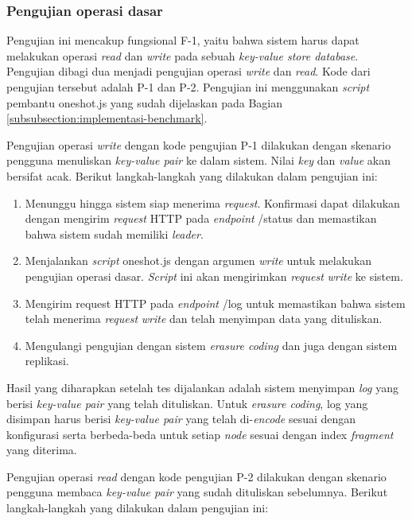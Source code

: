 \subsubsection{Pengujian operasi dasar}
\label{subsubsection:pengujian-operasi-dasar}

Pengujian ini mencakup fungsional F-1, yaitu bahwa sistem harus dapat melakukan operasi \textit{read} dan \textit{write} pada sebuah \textit{key-value store database}. Pengujian dibagi dua menjadi pengujian operasi \textit{write} dan \textit{read}. Kode dari pengujian tersebut adalah P-1 dan P-2. Pengujian ini menggunakan \textit{script} pembantu oneshot.js yang sudah dijelaskan pada Bagian \ref{subsubsection:implementasi-benchmark}.

Pengujian operasi \textit{write} dengan kode pengujian P-1 dilakukan dengan skenario pengguna menuliskan \textit{key-value pair} ke dalam sistem. Nilai \textit{key} dan \textit{value} akan bersifat acak. Berikut langkah-langkah yang dilakukan dalam pengujian ini:

\begin{enumerate}
  \item Menunggu hingga sistem siap menerima \textit{request}. Konfirmasi dapat dilakukan dengan mengirim \textit{request} HTTP pada \textit{endpoint} /status dan memastikan bahwa sistem sudah memiliki \textit{leader}.
  \item Menjalankan \textit{script} oneshot.js dengan argumen \textit{write} untuk melakukan pengujian operasi dasar. \textit{Script} ini akan mengirimkan \textit{request} \textit{write} ke sistem.
  \item Mengirim request HTTP pada \textit{endpoint} /log untuk memastikan bahwa sistem telah menerima \textit{request} \textit{write} dan telah menyimpan data yang dituliskan.
  \item Mengulangi pengujian dengan sistem \textit{erasure coding} dan juga dengan sistem replikasi.
\end{enumerate}

Hasil yang diharapkan setelah tes dijalankan adalah sistem menyimpan \textit{log} yang berisi \textit{key-value pair} yang telah dituliskan. Untuk \textit{erasure coding}, log yang disimpan harus berisi \textit{key-value pair} yang telah di-\textit{encode} sesuai dengan konfigurasi serta berbeda-beda untuk setiap \textit{node} sesuai dengan index \textit{fragment} yang diterima.

Pengujian operasi \textit{read} dengan kode pengujian P-2 dilakukan dengan skenario pengguna membaca \textit{key-value pair} yang sudah dituliskan sebelumnya. Berikut langkah-langkah yang dilakukan dalam pengujian ini:

